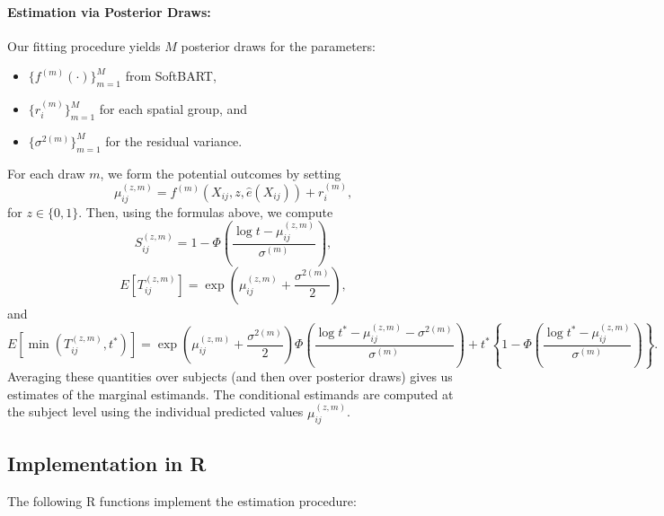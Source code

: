 \documentclass[useAMS,referee]{biom}
\begin{document}
\paragraph{Estimation via Posterior Draws:}  
Our fitting procedure yields \(M\) posterior draws for the parameters:
\begin{itemize}
    \item \(\{f^{(m)}(\cdot)\}_{m=1}^M\) from SoftBART,
    \item \(\{r_i^{(m)}\}_{m=1}^M\) for each spatial group, and
    \item \(\{\sigma^{2(m)}\}_{m=1}^M\) for the residual variance.
\end{itemize}
For each draw \(m\), we form the potential outcomes by setting
\[
\mu_{ij}^{(z, m)} = f^{(m)}(X_{ij}, z, \hat{e}(X_{ij})) + r_{i}^{(m)},
\]
for \(z \in \{0,1\}\). Then, using the formulas above, we compute
\[
S_{ij}^{(z, m)} = 1 - \Phi\left(\frac{\log t - \mu_{ij}^{(z, m)}}{\sigma^{(m)}}\right),
\]
\[
E[T_{ij}^{(z, m)}] = \exp\left(\mu_{ij}^{(z, m)} + \frac{\sigma^{2(m)}}{2}\right),
\]
and
\[
E\left[\min\left(T_{ij}^{(z, m)}, t^*\right)\right] = \exp\left(\mu_{ij}^{(z, m)} + \frac{\sigma^{2(m)}}{2}\right)\Phi\left(\frac{\log t^* - \mu_{ij}^{(z, m)} - \sigma^{2(m)}}{\sigma^{(m)}}\right) + t^*\left\{1 - \Phi\left(\frac{\log t^* - \mu_{ij}^{(z, m)}}{\sigma^{(m)}}\right)\right\}.
\]
Averaging these quantities over subjects (and then over posterior draws) gives us estimates of the marginal estimands. The conditional estimands are computed at the subject level using the individual predicted values \(\mu_{ij}^{(z, m)}\).

\subsection{Implementation in R}

The following R functions implement the estimation procedure:
\end{document}
